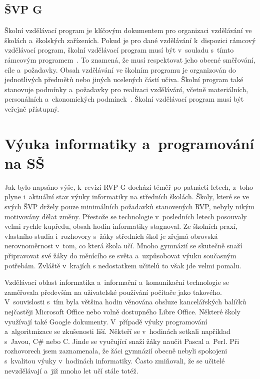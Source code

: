 \documentclass[
  digital,     %
  oneside,     %
  nosansbold,  %
  colorbold, %
  lof,         %
  nolot,         %
]{fithesis4}
\begin{document}
\subsection{ŠVP G}
Školní vzdělávací program je klíčovým dokumentem pro organizaci vzdělávání ve školách a~školských zařízeních. Pokud je pro dané vzdělávání k~dispozici rámcový vzdělávací program, školní vzdělávací program musí být v~souladu s~tímto rámcovým programem~\cite{npiRVP}. To znamená, že musí respektovat jeho obecné směřování, cíle a~požadavky. Obsah vzdělávání ve školním programu je organizován do jednotlivých předmětů nebo jiných ucelených částí učiva. Školní program také stanovuje podmínky a~požadavky pro realizaci vzdělávání, včetně materiálních, personálních a~ekonomických podmínek~\cite{npiRVP}. Školní vzdělávací program musí být veřejně přístupný. 


\section{Výuka informatiky a~programování na SŠ}
Jak bylo napsáno výše, k~revizi RVP G dochází téměř po patnácti letech, z~toho plyne i~aktuální stav výuky informatiky na středních školách. Školy, které se ve svých ŠVP držely pouze minimálních požadavků stanovených RVP, nebyly nikým motivovány dělat změny. Přestože se technologie v~posledních letech posouvaly velmi rychle kupředu, obsah hodin informatiky stagnoval. Ze školních praxí, vlastního studia i~rozhovory s~žáky středních škol je zřejmá obrovská nerovnoměrnost v~tom, co která škola učí. Mnoho gymnázií se skutečně snaží připravovat své žáky do měnícího se světa a~uzpůsobovat výuku současným potřebám. Zvláště v~krajích s nedostatkem učitelů to však jde velmi pomalu.

Vzdělávací oblast informatika a~informační a~komunikační technologie se zaměřovala především na uživatelské používání počítače jako takového. V~souvislosti s~tím byla většina hodin věnována obsluze kancelářských balíčků nejčastěji Microsoft Office nebo volně dostupného Libre Office. Některé školy využívají také Google dokumenty. V~případě výuky programování a~algoritmizace se zkušenosti liší. Někteří se v~hodinách setkali například s~Javou, C\# nebo C. Jinde se vyučující snaží žáky naučit Pascal a~Perl. Při rozhovorech jsem zaznamenala, že  žáci gymnázií obecně nebyli spokojeni s~kvalitou výuky v~hodinách informatiky. Často zmiňovali, že se učitelé nevzdělávají a~již mnoho let učí stále totéž.
\end{document}
